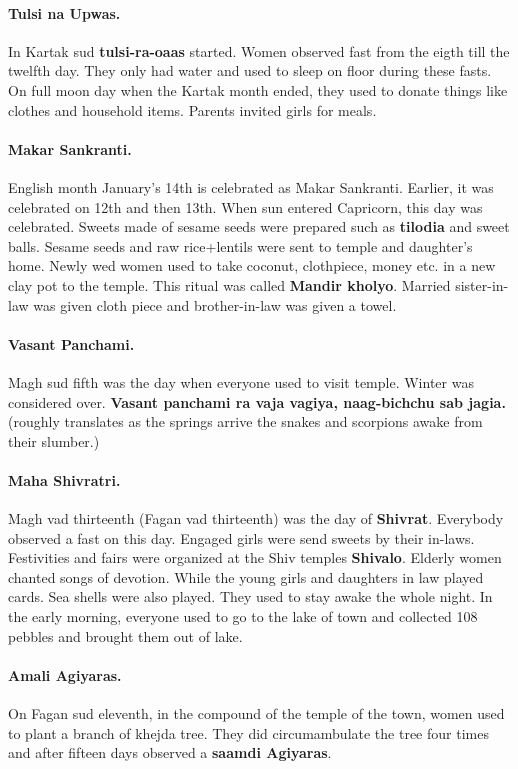 \paragraph{Tulsi na Upwas.} In Kartak sud \textbf{tulsi-ra-oaas} started. Women
observed fast from the eigth till the twelfth day. They only had water and used
to sleep on floor during these fasts. On full moon day when the Kartak month
ended, they used to donate things like clothes and household items. Parents
invited girls for meals.  \paragraph{Makar Sankranti.} English month January's
14th is celebrated as Makar Sankranti. Earlier, it was celebrated on 12th and
then 13th. When sun entered Capricorn, this day was celebrated. Sweets made of
sesame seeds were prepared such as \textbf{tilodia} and sweet balls. Sesame
seeds and raw rice+lentils were sent to temple and daughter's home. Newly wed
women used to take coconut, clothpiece, money etc. in a new clay pot to the
temple. This ritual was called \textbf{Mandir kholyo}. Married sister-in-law
was given cloth piece and brother-in-law was given a towel.  \paragraph{Vasant
Panchami.} Magh sud fifth was the day when everyone used to visit temple.
Winter was considered over. \textbf{Vasant panchami ra vaja vagiya,
naag-bichchu sab jagia.} (roughly translates as the springs arrive the snakes
and scorpions awake from their slumber.) \paragraph{Maha Shivratri.} Magh vad
thirteenth (Fagan vad thirteenth) was the day of \textbf{Shivrat}. Everybody
observed a fast on this day. Engaged girls were send sweets by their in-laws.
Festivities and fairs were organized at the Shiv temples \textbf{Shivalo}.
Elderly women chanted songs of devotion. While the young girls and daughters in
law played cards. Sea shells were also played.  They used to stay awake the
whole night. In the early morning, everyone used to go to the lake of town and
collected 108 pebbles and brought them out of lake.  \paragraph{Amali
Agiyaras.} On Fagan sud eleventh, in the compound of the temple of the town,
women used to plant a branch of khejda tree. They did circumambulate the tree
four times and after fifteen days observed a \textbf{saamdi Agiyaras}.

